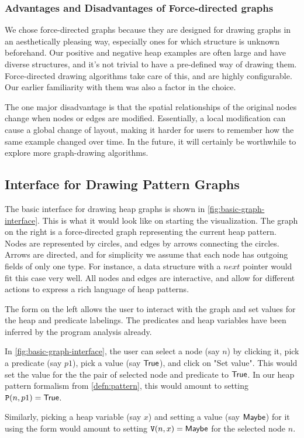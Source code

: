 \subsubsection{Advantages and Disadvantages of Force-directed graphs}
We chose force-directed graphs because they are designed for drawing graphs in an aesthetically pleasing way, especially ones for which structure is unknown beforehand. Our positive and negative heap examples are often large and have diverse structures, and it's not trivial to have a pre-defined way of drawing them. Force-directed drawing algorithms take care of this, and are highly configurable. Our earlier familiarity with them was also a factor in the choice.

The one major disadvantage is that the spatial relationships of the original nodes change when nodes or edges are modified. Essentially, a local modification can cause a global change of layout, making it harder for users to remember how the same example changed over time. In the future, it will certainly be worthwhile to explore more graph-drawing algorithms.

\subsection{Interface for Drawing Pattern Graphs}

The basic interface for drawing heap graphs is shown in \autoref{fig:basic-graph-interface}. This is what it would look like on starting the visualization. The graph on the right is a force-directed graph representing the current heap pattern. Nodes are represented by circles, and edges by arrows connecting the circles. Arrows are directed, and for simplicity we assume that each node has outgoing fields of only one type. For instance, a data structure with a $next$ pointer would fit this case very well. All nodes and edges are interactive, and allow for different actions to express a rich language of heap patterns.

The form on the left allows the user to interact with the graph and set values for the heap and predicate labelings. The predicates and heap variables have been inferred by the program analysis already.

\begin{ex}
\label{ex:basic-graph-interface}
In \autoref{fig:basic-graph-interface}, the user can select a node (say $n$) by clicking it, pick a predicate (say $p1$), pick a value (say $\mathsf{True}$), and click on "Set value". This would set the value for the the pair of selected node and predicate to $\mathsf{True}$. In our heap pattern formalism from \autoref{defn:pattern}, this would amount to setting $\mathtt{P}(n, p1) = \mathsf{True}$.

Similarly, picking a heap variable (say $x$) and setting a value (say $\mathsf{Maybe}$) for it using the form would amount to setting $\mathtt{V}(n,x) = \mathsf{Maybe}$ for the selected node $n$.
\end{ex}

